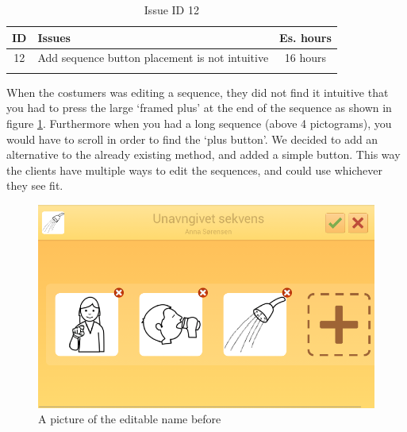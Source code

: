 \begin{longtable} { | c | p{12cm} | c | } 
\hline
	ID 	&	Issues	&		 Es. hours \\\hline
	12 	&	Add sequence button placement is not intuitive	&	16 hours \\\hline
\caption{Issue ID 12}
\label{tab:spr3_addsequencenotintuitive}
\end{longtable}

When the costumers was editing a sequence, they did not find it intuitive that you had to press the large `framed plus' at the end of the sequence as shown in figure \ref{fig:Old_editSequence}. Furthermore when you had a long sequence (above 4 pictograms), you would have to scroll in order to find the `plus button'. We decided to add an alternative to the already existing method, and added a simple button.  This way the clients have multiple ways to edit the sequences, and could use whichever they see fit.

\begin{figure} [h!]
\centering
\begin{minipage}{.7\textwidth}
\centering
\includegraphics{Pics/Sprint3/EditModeCropped}
\caption{A picture of the editable name before}
\label{fig:Old_editSequence}
\end{minipage}\hfill
\end{figure}